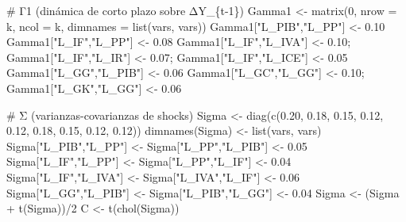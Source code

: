 \documentclass[
  spanish,
  letterpaper,
  DIV=11,
  numbers=noendperiod]{scrartcl}
\newenvironment{Shaded}{\begin{snugshade}}{\end{snugshade}}
\newcommand{\AttributeTok}[1]{\textcolor[rgb]{0.40,0.45,0.13}{#1}}
\newcommand{\CommentTok}[1]{\textcolor[rgb]{0.37,0.37,0.37}{#1}}
\newcommand{\DecValTok}[1]{\textcolor[rgb]{0.68,0.00,0.00}{#1}}
\newcommand{\FloatTok}[1]{\textcolor[rgb]{0.68,0.00,0.00}{#1}}
\newcommand{\FunctionTok}[1]{\textcolor[rgb]{0.28,0.35,0.67}{#1}}
\newcommand{\NormalTok}[1]{\textcolor[rgb]{0.00,0.23,0.31}{#1}}
\newcommand{\OtherTok}[1]{\textcolor[rgb]{0.00,0.23,0.31}{#1}}
\newcommand{\SpecialCharTok}[1]{\textcolor[rgb]{0.37,0.37,0.37}{#1}}
\newcommand{\StringTok}[1]{\textcolor[rgb]{0.13,0.47,0.30}{#1}}
\begin{document}
\begin{Shaded}
\begin{Highlighting}[]
\CommentTok{\# Γ1 (dinámica de corto plazo sobre ΔY\_\{t{-}1\})}
\NormalTok{Gamma1 }\OtherTok{\textless{}{-}} \FunctionTok{matrix}\NormalTok{(}\DecValTok{0}\NormalTok{, }\AttributeTok{nrow =}\NormalTok{ k, }\AttributeTok{ncol =}\NormalTok{ k, }\AttributeTok{dimnames =} \FunctionTok{list}\NormalTok{(vars, vars))}
\NormalTok{Gamma1[}\StringTok{"L\_PIB"}\NormalTok{,}\StringTok{"L\_PP"}\NormalTok{] }\OtherTok{\textless{}{-}} \FloatTok{0.10}
\NormalTok{Gamma1[}\StringTok{"L\_IF"}\NormalTok{,}\StringTok{"L\_PP"}\NormalTok{]  }\OtherTok{\textless{}{-}} \FloatTok{0.08}
\NormalTok{Gamma1[}\StringTok{"L\_IF"}\NormalTok{,}\StringTok{"L\_IVA"}\NormalTok{] }\OtherTok{\textless{}{-}} \FloatTok{0.10}\NormalTok{; Gamma1[}\StringTok{"L\_IF"}\NormalTok{,}\StringTok{"L\_IR"}\NormalTok{] }\OtherTok{\textless{}{-}} \FloatTok{0.07}\NormalTok{; Gamma1[}\StringTok{"L\_IF"}\NormalTok{,}\StringTok{"L\_ICE"}\NormalTok{] }\OtherTok{\textless{}{-}} \FloatTok{0.05}
\NormalTok{Gamma1[}\StringTok{"L\_GG"}\NormalTok{,}\StringTok{"L\_PIB"}\NormalTok{] }\OtherTok{\textless{}{-}} \FloatTok{0.06}
\NormalTok{Gamma1[}\StringTok{"L\_GC"}\NormalTok{,}\StringTok{"L\_GG"}\NormalTok{]  }\OtherTok{\textless{}{-}} \FloatTok{0.10}\NormalTok{; Gamma1[}\StringTok{"L\_GK"}\NormalTok{,}\StringTok{"L\_GG"}\NormalTok{] }\OtherTok{\textless{}{-}} \FloatTok{0.06}

\CommentTok{\# Σ (varianzas{-}covarianzas de shocks)}
\NormalTok{Sigma }\OtherTok{\textless{}{-}} \FunctionTok{diag}\NormalTok{(}\FunctionTok{c}\NormalTok{(}\FloatTok{0.20}\NormalTok{, }\FloatTok{0.18}\NormalTok{, }\FloatTok{0.15}\NormalTok{, }\FloatTok{0.12}\NormalTok{, }\FloatTok{0.12}\NormalTok{, }\FloatTok{0.18}\NormalTok{, }\FloatTok{0.15}\NormalTok{, }\FloatTok{0.12}\NormalTok{, }\FloatTok{0.12}\NormalTok{))}
\FunctionTok{dimnames}\NormalTok{(Sigma) }\OtherTok{\textless{}{-}} \FunctionTok{list}\NormalTok{(vars, vars)}
\NormalTok{Sigma[}\StringTok{"L\_PIB"}\NormalTok{,}\StringTok{"L\_PP"}\NormalTok{] }\OtherTok{\textless{}{-}}\NormalTok{ Sigma[}\StringTok{"L\_PP"}\NormalTok{,}\StringTok{"L\_PIB"}\NormalTok{] }\OtherTok{\textless{}{-}} \FloatTok{0.05}
\NormalTok{Sigma[}\StringTok{"L\_IF"}\NormalTok{,}\StringTok{"L\_PP"}\NormalTok{]  }\OtherTok{\textless{}{-}}\NormalTok{ Sigma[}\StringTok{"L\_PP"}\NormalTok{,}\StringTok{"L\_IF"}\NormalTok{]  }\OtherTok{\textless{}{-}} \FloatTok{0.04}
\NormalTok{Sigma[}\StringTok{"L\_IF"}\NormalTok{,}\StringTok{"L\_IVA"}\NormalTok{] }\OtherTok{\textless{}{-}}\NormalTok{ Sigma[}\StringTok{"L\_IVA"}\NormalTok{,}\StringTok{"L\_IF"}\NormalTok{] }\OtherTok{\textless{}{-}} \FloatTok{0.06}
\NormalTok{Sigma[}\StringTok{"L\_GG"}\NormalTok{,}\StringTok{"L\_PIB"}\NormalTok{] }\OtherTok{\textless{}{-}}\NormalTok{ Sigma[}\StringTok{"L\_PIB"}\NormalTok{,}\StringTok{"L\_GG"}\NormalTok{] }\OtherTok{\textless{}{-}} \FloatTok{0.04}
\NormalTok{Sigma }\OtherTok{\textless{}{-}}\NormalTok{ (Sigma }\SpecialCharTok{+} \FunctionTok{t}\NormalTok{(Sigma))}\SpecialCharTok{/}\DecValTok{2}
\NormalTok{C }\OtherTok{\textless{}{-}} \FunctionTok{t}\NormalTok{(}\FunctionTok{chol}\NormalTok{(Sigma))}


\end{Highlighting}
\end{Shaded}
\end{document}
